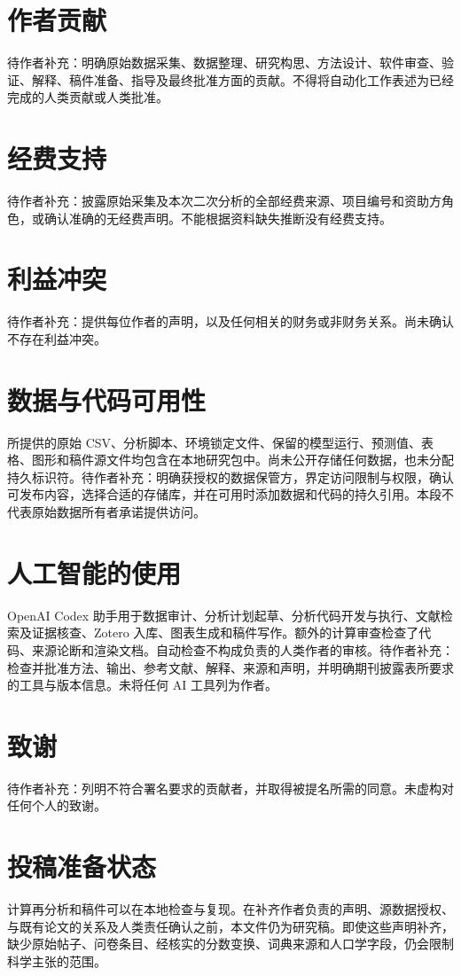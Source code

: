 \documentclass[11pt,letterpaper]{article}
\begin{document}
\section{作者贡献}\label{ux4f5cux8005ux8d21ux732e}

待作者补充：明确原始数据采集、数据整理、研究构思、方法设计、软件审查、验证、解释、稿件准备、指导及最终批准方面的贡献。不得将自动化工作表述为已经完成的人类贡献或人类批准。

\section{经费支持}\label{ux7ecfux8d39ux652fux6301}

待作者补充：披露原始采集及本次二次分析的全部经费来源、项目编号和资助方角色，或确认准确的无经费声明。不能根据资料缺失推断没有经费支持。

\section{利益冲突}\label{ux5229ux76caux51b2ux7a81}

待作者补充：提供每位作者的声明，以及任何相关的财务或非财务关系。尚未确认不存在利益冲突。

\section{数据与代码可用性}\label{ux6570ux636eux4e0eux4ee3ux7801ux53efux7528ux6027}

所提供的原始 CSV、分析脚本、环境锁定文件、保留的模型运行、预测值、表格、图形和稿件源文件均包含在本地研究包中。尚未公开存储任何数据，也未分配持久标识符。待作者补充：明确获授权的数据保管方，界定访问限制与权限，确认可发布内容，选择合适的存储库，并在可用时添加数据和代码的持久引用。本段不代表原始数据所有者承诺提供访问。

\section{人工智能的使用}\label{ux4ebaux5de5ux667aux80fdux7684ux4f7fux7528}

OpenAI Codex 助手用于数据审计、分析计划起草、分析代码开发与执行、文献检索及证据核查、Zotero 入库、图表生成和稿件写作。额外的计算审查检查了代码、来源论断和渲染文档。自动检查不构成负责的人类作者的审核。待作者补充：检查并批准方法、输出、参考文献、解释、来源和声明，并明确期刊披露表所要求的工具与版本信息。未将任何 AI 工具列为作者。

\section{致谢}\label{ux81f4ux8c22}

待作者补充：列明不符合署名要求的贡献者，并取得被提名所需的同意。未虚构对任何个人的致谢。

\section{投稿准备状态}\label{ux6295ux7a3fux51c6ux5907ux72b6ux6001}

计算再分析和稿件可以在本地检查与复现。在补齐作者负责的声明、源数据授权、与既有论文的关系及人类责任确认之前，本文件仍为研究稿。即使这些声明补齐，缺少原始帖子、问卷条目、经核实的分数变换、词典来源和人口学字段，仍会限制科学主张的范围。
\end{document}
